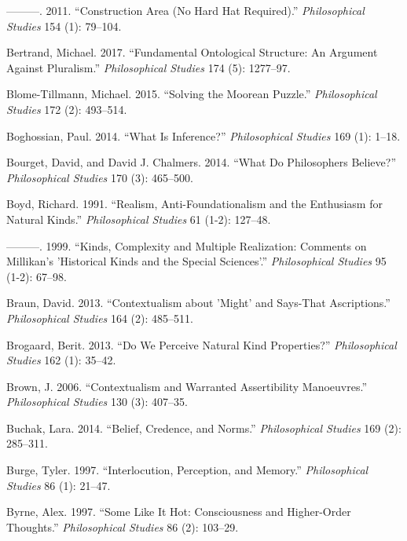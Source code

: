 \documentclass[
  10pt,
  letterpaper,
  DIV=11,
  numbers=noendperiod,
  twoside]{scrartcl}
\newlength{\cslhangindent}
\newenvironment{CSLReferences}[2] %
 {\begin{list}{}{%
  \setlength{\itemindent}{0pt}
  \setlength{\leftmargin}{0pt}
  \setlength{\parsep}{0pt}
  \ifodd #1
   \setlength{\leftmargin}{\cslhangindent}
   \setlength{\itemindent}{-1\cslhangindent}
  \fi
  \setlength{\itemsep}{#2\baselineskip}}}
 {\end{list}}
\begin{document}
\begin{CSLReferences}{1}{0}
---------. 2011. {``Construction Area (No Hard Hat Required).''}
\emph{Philosophical Studies} 154 (1): 79--104.

Bertrand, Michael. 2017. {``Fundamental Ontological Structure: An
Argument Against Pluralism.''} \emph{Philosophical Studies} 174 (5):
1277--97.

Blome-Tillmann, Michael. 2015. {``Solving the Moorean Puzzle.''}
\emph{Philosophical Studies} 172 (2): 493--514.

Boghossian, Paul. 2014. {``What Is Inference?''} \emph{Philosophical
Studies} 169 (1): 1--18.

Bourget, David, and David J. Chalmers. 2014. {``What Do Philosophers
Believe?''} \emph{Philosophical Studies} 170 (3): 465--500.

Boyd, Richard. 1991. {``Realism, Anti-Foundationalism and the Enthusiasm
for Natural Kinds.''} \emph{Philosophical Studies} 61 (1-2): 127--48.

---------. 1999. {``Kinds, Complexity and Multiple Realization: Comments
on Millikan's 'Historical Kinds and the Special Sciences'.''}
\emph{Philosophical Studies} 95 (1-2): 67--98.

Braun, David. 2013. {``Contextualism about 'Might' and Says-That
Ascriptions.''} \emph{Philosophical Studies} 164 (2): 485--511.

Brogaard, Berit. 2013. {``Do We Perceive Natural Kind Properties?''}
\emph{Philosophical Studies} 162 (1): 35--42.

Brown, J. 2006. {``Contextualism and Warranted Assertibility
Manoeuvres.''} \emph{Philosophical Studies} 130 (3): 407--35.

Buchak, Lara. 2014. {``Belief, Credence, and Norms.''}
\emph{Philosophical Studies} 169 (2): 285--311.

Burge, Tyler. 1997. {``Interlocution, Perception, and Memory.''}
\emph{Philosophical Studies} 86 (1): 21--47.

Byrne, Alex. 1997. {``Some Like It Hot: Consciousness and Higher-Order
Thoughts.''} \emph{Philosophical Studies} 86 (2): 103--29.


\end{CSLReferences}
\end{document}
